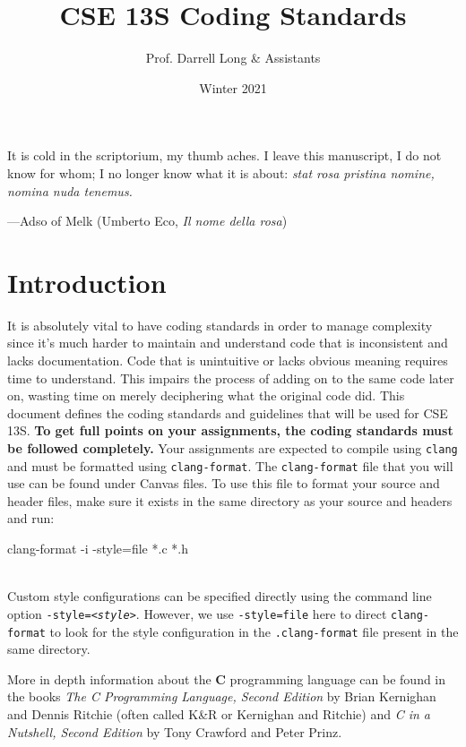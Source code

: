 \documentclass[11pt]{article}
\title{CSE 13S Coding Standards}
\author{Prof. Darrell Long \& Assistants}
\date{Winter 2021}
\begin{document}
\maketitle

\textwidth
\epigraph{It is cold in the scriptorium, my thumb aches. I leave
this manuscript, I do not know for whom; I no longer know what it
is about: \emph{stat rosa pristina nomine, nomina nuda tenemus.}}{---Adso of
Melk (Umberto Eco, \emph{Il nome della rosa})}

\section{Introduction}

It is absolutely vital to have coding standards in order to manage complexity
since it's much harder to maintain and understand code that is inconsistent and
lacks documentation. Code that is unintuitive or lacks obvious meaning requires
time to understand. This impairs the process of adding on to the same code
later on, wasting time on merely deciphering what the original code did.
This document defines the coding standards and guidelines that
will be used for CSE\,13S. \textbf{To get full points on your assignments, the
coding standards must be followed completely.} Your assignments are expected to
compile using \texttt{clang} and must be formatted using \texttt{clang-format}.
The \texttt{clang-format} file that you will use can be found under Canvas
files. To use this file to format your source and header files, make sure it
exists in the same directory as your source and headers and run:

\begin{codelisting}{}
clang-format -i -style=file *.c *.h
\end{codelisting}\\


\noindent Custom style configurations can be specified directly using the command line option
\texttt{-style=\emph{<style>}}. However, we use \texttt{-style=file} here to direct \texttt{clang-format} 
to look for the style configuration in the \texttt{.clang-format} file present in the same directory.

More in depth information about the \textbf{C} programming language can be found
in the books \emph{The C Programming Language, Second Edition} by Brian
Kernighan and Dennis Ritchie (often called K\&R or Kernighan and Ritchie) and
\emph{C in a Nutshell, Second Edition} by Tony Crawford and Peter Prinz.
\end{document}
